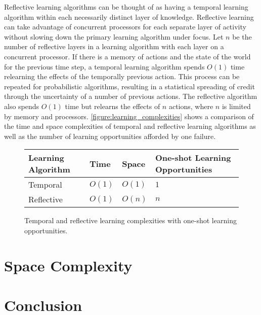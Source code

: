 Reflective learning algorithms can be thought of as having a temporal
learning algorithm within each necessarily distinct layer of
knowledge.  Reflective learning can take advantage of concurrent
processors for each separate layer of activity without slowing down
the primary learning algorithm under focus.  Let $n$ be the number of
reflective layers in a learning algorithm with each layer on a
concurrent processor.  If there is a memory of actions and the state
of the world for the previous time step, a temporal learning algorithm
spends $O(1)$ time relearning the effects of the temporally previous
action.  This process can be repeated for probabilistic algorithms,
resulting in a statistical spreading of credit through the uncertainty
of a number of previous actions.  The reflective algorithm also spends
$O(1)$ time but relearns the effects of $n$ actions, where $n$ is
limited by memory and processors.
{\mbox{\autoref{figure:learning_complexities}}} shows a comparison of
the time and space complexities of temporal and reflective learning
algorithms as well as the number of learning opportunities afforded by
one failure.
\begin{figure}
\center
\begin{tabular}{p{2cm}|p{2cm}|p{2cm}|p{3cm}}
Learning Algorithm & Time   & Space  & One-shot Learning Opportunities \\ \hline
Temporal           & $O(1)$ & $O(1)$ & $1$ \\
Reflective         & $O(1)$ & $O(n)$ & $n$ \\
\end{tabular}
\caption{Temporal and reflective learning complexities with one-shot learning opportunities.}
\label{figure:learning_complexities}
\end{figure}



\section{Space Complexity}

\section{Conclusion}



